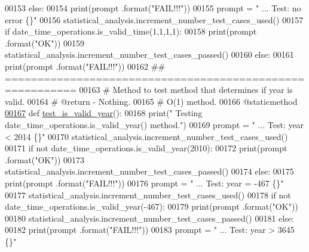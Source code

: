 \begin{DoxyCode}
00153         \textcolor{keywordflow}{else}:
00154             print(prompt .format(\textcolor{stringliteral}{"FAIL!!!"}))
00155         prompt = \textcolor{stringliteral}{"  ... Test: no error                  \{\}"}
00156         statistical\_analysis.increment\_number\_test\_cases\_used()
00157         \textcolor{keywordflow}{if} date\_time\_operations.is\_valid\_time(1,1,1,1):
00158             print(prompt .format(\textcolor{stringliteral}{"OK"}))
00159             statistical\_analysis.increment\_number\_test\_cases\_passed()
00160         \textcolor{keywordflow}{else}:
00161             print(prompt .format(\textcolor{stringliteral}{"FAIL!!!"}))
00162     \textcolor{comment}{## =========================================================}
00163     \textcolor{comment}{#   Method to test method that determines if year is valid.}
00164     \textcolor{comment}{#   @return - Nothing.}
00165     \textcolor{comment}{#   O(1) method.}
00166     @staticmethod
\hypertarget{date__time__processing__tester_8py_source_l00167}{}\hyperlink{classutilities_1_1date__time__processing__tester_1_1date__time__operations__tester_ae745c61827bc1d30d5c964b4d9586343}{00167}     \textcolor{keyword}{def }\hyperlink{classutilities_1_1date__time__processing__tester_1_1date__time__operations__tester_ae745c61827bc1d30d5c964b4d9586343}{test\_is\_valid\_year}():
00168         print(\textcolor{stringliteral}{" Testing date\_time\_operations.is\_valid\_year() method."})
00169         prompt = \textcolor{stringliteral}{"  ... Test: year < 2014                   \{\}"}
00170         statistical\_analysis.increment\_number\_test\_cases\_used()
00171         \textcolor{keywordflow}{if} \textcolor{keywordflow}{not} date\_time\_operations.is\_valid\_year(2010):
00172             print(prompt .format(\textcolor{stringliteral}{"OK"}))
00173             statistical\_analysis.increment\_number\_test\_cases\_passed()
00174         \textcolor{keywordflow}{else}:
00175             print(prompt .format(\textcolor{stringliteral}{"FAIL!!!"}))
00176         prompt = \textcolor{stringliteral}{"  ... Test: year = -467                   \{\}"}
00177         statistical\_analysis.increment\_number\_test\_cases\_used()
00178         \textcolor{keywordflow}{if} \textcolor{keywordflow}{not} date\_time\_operations.is\_valid\_year(-467):
00179             print(prompt .format(\textcolor{stringliteral}{"OK"}))
00180             statistical\_analysis.increment\_number\_test\_cases\_passed()
00181         \textcolor{keywordflow}{else}:
00182             print(prompt .format(\textcolor{stringliteral}{"FAIL!!!"}))
00183         prompt = \textcolor{stringliteral}{"  ... Test: year > 3645                   \{\}"}

\end{DoxyCode}
